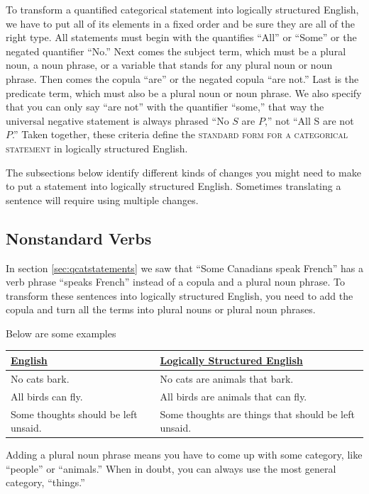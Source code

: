 To transform a quantified categorical statement into logically structured English, we have to put all of its elements in a fixed order and be sure they are all of the right type. All statements must begin with the quantifies ``All'' or ``Some'' or the negated quantifier ``No.'' Next comes the subject term, which must be a plural noun, a noun phrase, or a variable that stands for any plural noun or noun phrase. Then comes the copula ``are'' or the negated copula ``are not.'' Last is the predicate term, which must also be a plural noun or noun phrase. We also specify that you can only say ``are not'' with the quantifier ``some,'' that way the universal negative statement is always phrased ``No $S$ are $P$,'' not ``All S are not $P$.'' Taken together, these criteria define the \textsc{\gls{standard form for a categorical statement}} in logically structured English. \label{def:standard_form_cat_statement}

The subsections below identify different kinds of changes you might need to make to put a statement into logically structured English. Sometimes translating a sentence will require using multiple changes.

\subsection{Nonstandard Verbs}
\label{subsec:nonstandard_verbs}
In section \ref{sec:qcatstatements} we saw that ``Some Canadians speak French'' has a verb phrase ``speaks French'' instead of a copula and a plural noun phrase. To transform these sentences into logically structured English, you need to add the copula and turn all the terms into plural nouns or plural noun phrases. 

Below are some examples


\begin{longtabu}{p{.5\linewidth}p{.5\linewidth}}
\underline{English} &
\underline{Logically Structured English} \\
\endhead 
No cats bark. &
No cats are animals that bark.  \\ 

All birds can fly. &
All birds are animals that can fly.  \\

Some thoughts should be left unsaid. &
Some thoughts are things that should be left unsaid. 
\end{longtabu}



Adding a plural noun phrase means you have to come up with some category, like ``people'' or ``animals.'' When in doubt, you can always use the most general category, ``things.'' 


